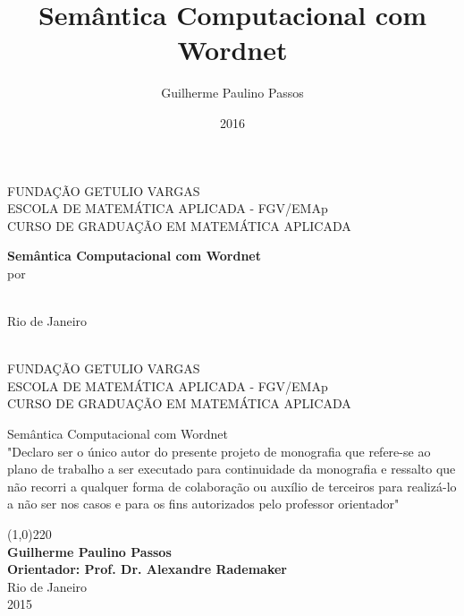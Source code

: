 \documentclass[12pt, a4paper, twoside]{article}
\title{Semântica Computacional com Wordnet} \newcommand{\usetitle}{Semântica Computacional com Wordnet}
\author{Guilherme Paulino Passos} \newcommand{\useauthor}{\Guilherme Paulino Passos}
\date{2016}
\theoremstyle{definition}
\newcommand{\supervisor}{Alexandre Rademaker}
\begin{document}
\begin{titlepage}
 \begin{center}
  { \large FUNDAÇÃO GETULIO VARGAS}\\[0.3cm]
  { \large ESCOLA DE MATEMÁTICA APLICADA - FGV/EMAp}\\[0.5cm]
  { \large CURSO DE GRADUAÇÃO EM MATEMÁTICA APLICADA}\\[0.3cm]
 
  \vspace{55 mm}

  {\bf \large \usetitle} \\[1.2cm]

  { por}\\[0.6cm]
  {\large {\theauthor}}\\[0.1cm]


  \vspace{7cm}

  { Rio de Janeiro}\\[0.1cm]
  {\thedate}\\[0.6cm]
 \end{center}
\end{titlepage}

\begin{titlepage}
 
 \begin{center}
  {\large FUNDAÇÃO GETULIO VARGAS}\\[0.3cm]
  {\large ESCOLA DE MATEMÁTICA APLICADA - FGV/EMAp}\\[0.5cm]
  {\large CURSO DE GRADUAÇÃO EM MATEMÁTICA APLICADA}\\[0.3cm]


  \vspace{20 mm}


  {\large \usetitle}\\[2.1cm]

  
  "Declaro ser o único autor do presente projeto de monografia que refere-se ao
plano de trabalho a ser executado para continuidade da monografia e ressalto
que não recorri a qualquer forma de colaboração ou auxílio de terceiros para
realizá-lo a não ser nos casos e para os fins autorizados pelo professor orientador"

  \vspace{3.5cm}
  
  \line(1,0){220}\\[0.1cm]
  {\bf Guilherme Paulino Passos}\\[2cm]
  {\bf Orientador: Prof. Dr. \supervisor}\\[3cm]


  {Rio de Janeiro}\\[0.1cm]
  {2015}
 \end{center}
\end{titlepage}
\end{document}
